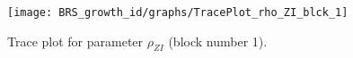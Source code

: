 \begin{figure}[H]
\centering
  \texttt{[image: BRS\_growth\_id/graphs/TracePlot\_rho\_ZI\_blck\_1]}\\
    \caption{Trace plot for parameter ${\rho_{ZI}}$ (block number 1).}
\end{figure}
